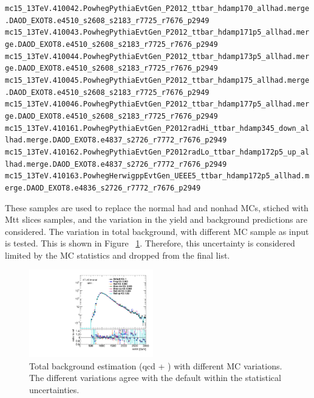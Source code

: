 {\verb|mc15_13TeV.410042.PowhegPythiaEvtGen_P2012_ttbar_hdamp170_allhad.merge.DAOD_EXOT8.e4510_s2608_s2183_r7725_r7676_p2949|\\
\verb|mc15_13TeV.410043.PowhegPythiaEvtGen_P2012_ttbar_hdamp171p5_allhad.merge.DAOD_EXOT8.e4510_s2608_s2183_r7725_r7676_p2949|\\
\verb|mc15_13TeV.410044.PowhegPythiaEvtGen_P2012_ttbar_hdamp173p5_allhad.merge.DAOD_EXOT8.e4510_s2608_s2183_r7725_r7676_p2949|\\
\verb|mc15_13TeV.410045.PowhegPythiaEvtGen_P2012_ttbar_hdamp175_allhad.merge.DAOD_EXOT8.e4510_s2608_s2183_r7725_r7676_p2949|\\
\verb|mc15_13TeV.410046.PowhegPythiaEvtGen_P2012_ttbar_hdamp177p5_allhad.merge.DAOD_EXOT8.e4510_s2608_s2183_r7725_r7676_p2949|\\
\verb|mc15_13TeV.410161.PowhegPythiaEvtGen_P2012radHi_ttbar_hdamp345_down_allhad.merge.DAOD_EXOT8.e4837_s2726_r7772_r7676_p2949|\\
\verb|mc15_13TeV.410162.PowhegPythiaEvtGen_P2012radLo_ttbar_hdamp172p5_up_allhad.merge.DAOD_EXOT8.e4837_s2726_r7772_r7676_p2949|\\
\verb|mc15_13TeV.410163.PowhegHerwigppEvtGen_UEEE5_ttbar_hdamp172p5_allhad.merge.DAOD_EXOT8.e4836_s2726_r7772_r7676_p2949|
}
\noindent

These \ttbar samples are used to replace the normal had and nonhad MCs, stiched with Mtt slices samples, and the variation in the \ttbar yield and background predictions are considered. The variation in total background, with different \ttbar MC sample as input is tested. This is shown in Figure ~\ref{fig:ttbar-MC}. Therefore, this uncertainty is considered limited by the MC statistics and dropped from the final list.

\begin{figure}[htbp!]
\begin{center} 
\includegraphics[width=0.48\textwidth,angle=-90]{figures/boosted/Other/directcompare_mHH_l_1_TwoTag_split_Top_syst_stat_postfit_all_.pdf}
\caption{Total background estimation (qcd + \ttbar) with different \ttbar MC variations. The different variations agree with the default within the statistical uncertainties.}
\label{fig:ttbar-MC}
\end{center}
\end{figure}
